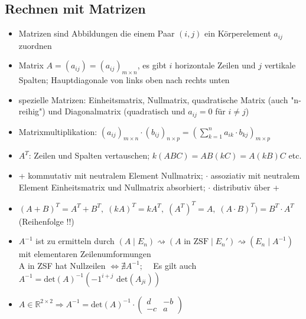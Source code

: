 \documentclass[10pt,a4paper]{article}
\begin{document}
\subsection{Rechnen mit Matrizen}
\begin{itemize}
\item Matrizen sind Abbildungen die einem Paar $(i,j)$ ein Körperelement $a_{ij}$ zuordnen 
\item Matrix $A=(a_{ij})=(a_{ij})_{m \times n}$, es gibt $i$ horizontale Zeilen und $j$ vertikale Spalten; Hauptdiagonale von links oben nach rechts unten
\item spezielle Matrizen: Einheitsmatrix, Nullmatrix, quadratische Matrix (auch "n-reihig") und Diagonalmatrix (quadratisch und $a_{ij}=0$ für $i\neq j$)
\item Matrixmultiplikation: $(a_{ij})_{m\times n} \cdot (b_{ij})_{n \times p}=(\sum_{k=1}^{n} a_{ik}\cdot b_{kj})_{m \times p}$ 
\item $A^{T}$: Zeilen und Spalten vertauschen; $k(ABC)=AB(kC)=A(kB)C$ etc.
\item + kommutativ mit neutralem Element Nullmatrix; $\cdot$ assoziativ mit neutralem Element Einheitsmatrix und Nullmatrix absorbiert; $\cdot$ distributiv über + 
\item $(A+B)^{T}=A^{T}+B^{T},\; (kA)^{T}=kA^{T},\; (A^{T})^{T}=A,\; (A\cdot B)^{T})=B^{T}\cdot A^{T}$ (Reihenfolge !!)
\item $A^{-1}$ ist zu ermitteln durch $(A\mid E_{n})\rightsquigarrow (A \text{ in ZSF} \mid E_{n}') \rightsquigarrow (E_{n} \mid A^{-1})$ mit elementaren Zeilenumformungen\\ A in ZSF hat Nullzeilen $\Leftrightarrow \nexists A^{-1};\;\;\;$ Es gilt auch $A^{-1}=\text{det}(A)^{-1}(-1^{i+j}\text{ det}(A_{ji}))$
\item $A\in \mathbb{R}^{2\times 2} \Rightarrow A^{-1}=\text{det}(A)^{-1}\cdot \begin{pmatrix} d& -b\\ -c&a\end{pmatrix}$
\end{itemize}
\end{document}
